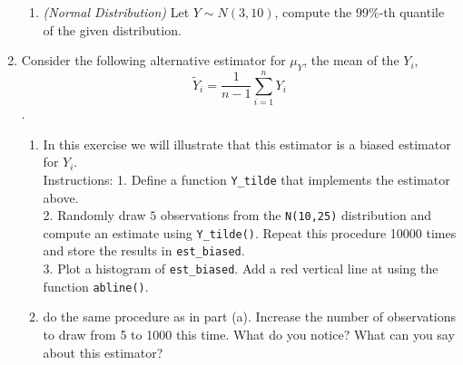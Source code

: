 \documentclass[11pt]{article}
\begin{document}
\begin{enumerate}
\begin{enumerate}
		\item \textit{(Normal Distribution)} Let $Y \sim N(3,10)$, compute the $99 \%$-th quantile of the given distribution.
	\end{enumerate}

\item Consider the following alternative estimator for $\mu_Y$, the mean of the $Y_i$,
$$ \tilde Y_i = \frac{1}{n-1} \sum_{i=1}^n Y_i $$.
\begin{enumerate}
	\item In this exercise we will illustrate that this estimator is a biased estimator for $Y_i$.\\
	Instructions: 1. Define a function \texttt{Y\_tilde} that implements the estimator above.\\
	2. Randomly draw $5$ observations from the \texttt{N(10,25)} distribution and compute an estimate using \texttt{Y\_tilde()}. Repeat this procedure 10000 times and store the results in \texttt{est\_biased}.\\
	3. Plot a histogram of \texttt{est\_biased}. Add a red vertical line at using the function \texttt{abline()}.
	\item do the same procedure as in part (a). Increase the number of observations to draw from 5 to 1000 this time. What do you notice? What can you say about this estimator?
\end{enumerate}
\end{enumerate}


\bigskip





\end{document}
